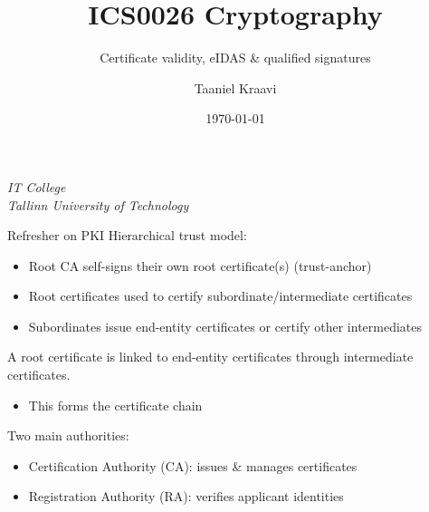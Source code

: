 \title{ICS0026 Cryptography}
\subtitle{Certificate validity, eIDAS \& qualified signatures}
\date{\today}
\author{Taaniel Kraavi}
\institute%
{%
  \textit{IT College}\\
  \textit{Tallinn University of Technology}
}


\begin{frame}
  \titlepage
\end{frame}

\begin{frame}{Refresher on PKI}
  Hierarchical trust model:
  \begin{itemize}[<+(1)->]
    \item Root CA self-signs their own root certificate(s) (trust-anchor)
    \item Root certificates used to certify subordinate/intermediate certificates
    \item Subordinates issue end-entity certificates or certify other intermediates
  \end{itemize}

  \vspace*{1em}

  \pause
  A root certificate is linked to end-entity certificates through intermediate certificates.
  \begin{itemize}[<+(1)->]
    \item This forms the certificate chain
  \end{itemize}

  \vspace*{1em}

  \pause
  Two main authorities:
  \begin{itemize}[<+(1)->]
    \item Certification Authority (CA): issues \& manages certificates
    \item Registration Authority (RA): verifies applicant identities
  \end{itemize}
\end{frame}

